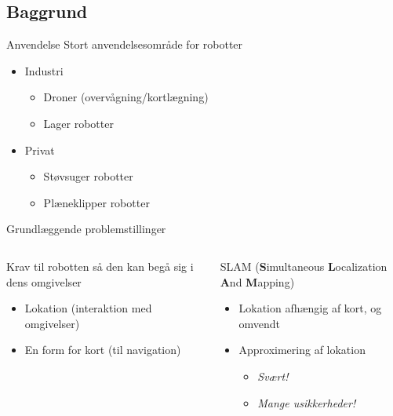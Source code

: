 \subsection{Baggrund}
\begin{frame}[fragile]{Anvendelse}
	Stort anvendelsesområde for robotter
	\begin{itemize}
		\item Industri
			\begin{itemize}
			\item Droner (overvågning/kortlægning)
			\item Lager robotter
			\end{itemize}
		\item Privat
			\begin{itemize}
			\item Støvsuger robotter
			\item Plæneklipper robotter
		\end{itemize}
	\end{itemize}
\end{frame}

\begin{frame}[fragile]{Grundlæggende problemstillinger}
	\begin{columns}
		\begin{column}{0.5\textwidth}
			Krav til robotten så den kan begå sig i dens omgivelser
			\linespace
			\begin{itemize}
				\item Lokation (interaktion med omgivelser)
				\item En form for kort (til navigation)
			\end{itemize}
		\end{column}
		\pause
		\begin{column}{0.5\textwidth}
			SLAM (\textbf{S}imultaneous \textbf{L}ocalization \textbf{A}nd \textbf{M}apping)
			\linespace
			\begin{itemize}
				\item Lokation afhængig af kort, og omvendt
				\item Approximering af lokation
				\begin{itemize}
				\item \textit{Svært!}
				\item \textit{Mange usikkerheder!}
				\end{itemize}
			\end{itemize}
		\end{column}
\end{columns}
\end{frame}


